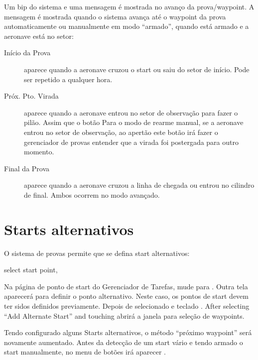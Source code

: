 Um bip do sistema e uma mensagem é mostrada no avanço da prova/waypoint.  A mensagem é mostrada quando o sistema avança até o waypoint da prova automaticamente ou manualmente em modo “armado”, quando está armado e a aeronave está no setor:
\begin{description}
\item[Início da Prova]  aparece quando a aeronave cruzou o start ou saiu do setor de início.  Pode ser repetido a qualquer hora.
\item[Próx. Pto. Virada]  aparece quando a aeronave entrou no setor de observação para fazer o pilão.  Assim que o botão 
  Para o modo de rearme manual, se a aeronave entrou no setor de observação, ao apertão este botão irá fazer o gerenciador de provas entender que a virada foi postergada para outro momento.
\item[Final da Prova]  aparece quando a aeronave cruzou a linha de chegada ou entrou no cilindro de final.  Ambos ocorrem no modo avançado. 
\end{description}


\section{Starts alternativos}\label{sec:alternate-starts}



O sistema de provas permite que se defina start alternativos:

\blink{} select start point, \blink{}

Na página de ponto de start do Gerenciador de Tarefas, mude para . Outra tela aparecerá para definir o ponto alternativo.  Neste caso, os pontos de start devem ter sidos definidos previamente.  Depois de selecionado  e teclado . After selecting ``Add Alternate Start'' and touching 
 abrirá a janela para seleção de waypoints.
 
Tendo configurado alguns Starts alternativos, o método “próximo waypoint” será novamente aumentado.  Antes da detecção de um start vário e tendo armado o start manualmente, no menu de botões irá aparecer  .


